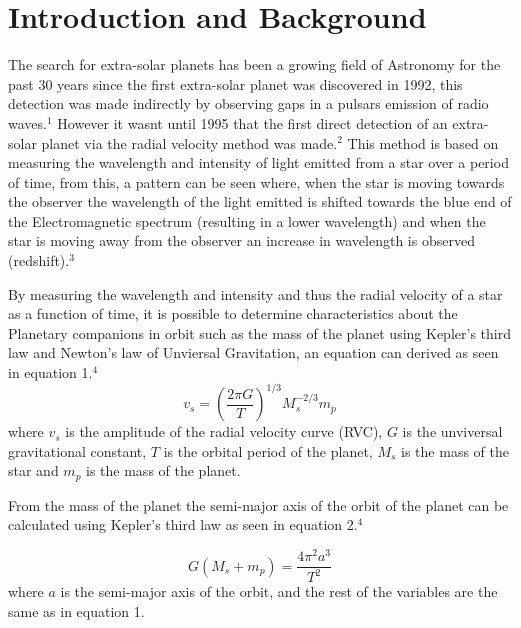 \documentclass[]{article}
\begin{document}
\section*{Introduction and Background}
The search for extra-solar planets has been a growing field of Astronomy for the 
past 30 years since the first extra-solar planet was discovered in 1992, this 
detection was made indirectly by observing gaps in a pulsars emission of radio waves.$^1 $
However it wasnt until 1995 that the first direct detection of an extra-solar planet 
via the radial velocity method was made.$^2$ This method is based on measuring the 
wavelength and intensity of light emitted from a star over a period of time, 
from this, a pattern can be seen where, when the star is moving towards the observer
the wavelength of the light emitted is shifted towards the blue end of the 
Electromagnetic spectrum 
(resulting in a lower wavelength) and when the star is moving away from the observer
an increase in wavelength is observed (redshift).$^3$
\par
By measuring the wavelength and intensity and thus the radial velocity of a star as 
a function of time, it is possible to determine characteristics about the Planetary
companions in orbit such as the mass of the planet using Kepler's third law and Newton's
law of Unviersal Gravitation, an equation can derived as seen in equation 1.$^4$
\begin{equation}\label{eq:mass of planet eq}
  v_s = \left(\frac{2\pi G}{T}\right)^{1/3}M_s^{-2/3}m_p
\end{equation}
where $v_s$ is the amplitude of the radial velocity curve (RVC), $G$ is the unviversal
gravitational constant, $T$ is the orbital period of the planet, $M_s$ is the mass of
the star and $m_p$ is the mass of the planet.
\par
From the mass of the planet the semi-major axis of the orbit of the planet can be 
calculated using Kepler's third law as seen in equation 2.$^4$

\begin{equation}\label{eq:semi-major axis eq}
  G(M_s+m_p) = \frac{4\pi^2a^3}{T^2}
\end{equation}
where $a$ is the semi-major axis of the orbit,
and the rest of the variables are the same as in equation 1.
\par
\end{document}
